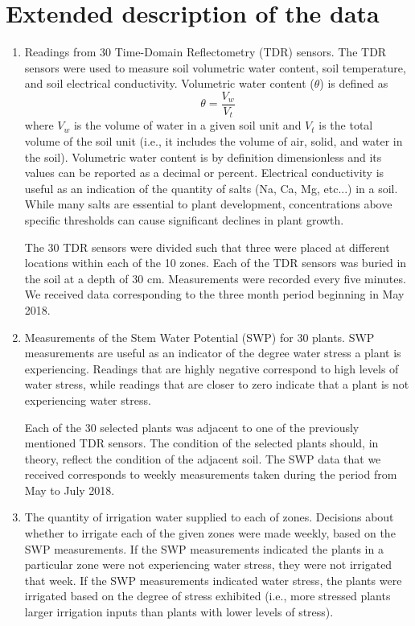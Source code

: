 \documentclass[12pt]{scrartcl}
\begin{document}
\appendix

\section{Extended description of the data}\label{sec:data-appendix}
\begin{enumerate}
\item Readings from 30 Time-Domain Reflectometry (TDR) sensors. The TDR sensors were used to measure soil volumetric water content, soil temperature, and soil electrical conductivity. Volumetric water content ($\theta$) is defined as $$\theta = \frac{V_w}{V_t}$$ where $V_w$ is the volume of water in a given soil unit and $V_t$ is the total volume of the soil unit (i.e., it includes the volume of air, solid, and water in the soil). Volumetric water content is by definition dimensionless and its values can be reported as a decimal or percent. Electrical conductivity is useful as an indication of the quantity of salts (Na\pch, Ca\pch[2], Mg\pch[2], etc...) in a soil. While many salts are essential to plant development, concentrations above specific thresholds can cause significant declines in plant growth.

The 30 TDR sensors were divided such that three were placed at different locations within each of the 10 zones. Each of the TDR sensors was buried in the soil at a depth of 30 cm. Measurements were recorded every five minutes. We received data corresponding to the three month period beginning in May 2018.

\item Measurements of the Stem Water Potential (SWP) for 30 plants. SWP measurements are useful as an indicator of the degree water stress a plant is experiencing. Readings that are highly negative correspond to high levels of water stress, while readings that are closer to zero indicate that a plant is not experiencing water stress.

Each of the 30 selected plants was adjacent to one of the previously mentioned TDR sensors. The condition of the selected plants should, in theory, reflect the condition of the adjacent soil. The SWP data that we received corresponds to weekly measurements taken during the period from May to July 2018.

\item The quantity of irrigation water supplied to each of zones. Decisions about whether to irrigate each of the given zones were made weekly, based on the SWP measurements. If the SWP measurements indicated the plants in a particular zone were not experiencing water stress, they were not irrigated that week. If the SWP measurements indicated water stress, the plants were irrigated based on the degree of stress exhibited (i.e., more stressed plants larger irrigation inputs than plants with lower levels of stress).


\end{enumerate}
\end{document}
